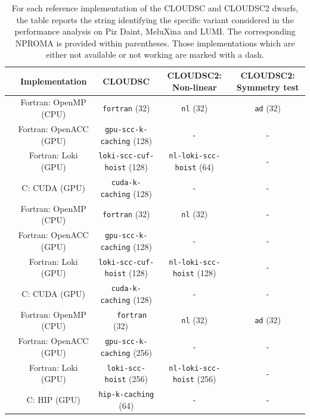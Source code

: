 \documentclass[gmd,manuscript,online]{copernicus}
\theoremstyle{theorem}
\theoremstyle{definition}
\theoremstyle{remark}
\theoremstyle{proposition}
\begin{document}
	\begin{table}[t!]
		\renewcommand{\arraystretch}{1.4}
		\centering
		\begin{footnotesize}
			\begin{tabular}{|c|c|c|c|c|}
				\hline
				& \textbf{Implementation} & \textbf{CLOUDSC} & \textbf{CLOUDSC2: Non-linear} & \textbf{CLOUDSC2: Symmetry test} \\
				\hline
				\multirow{4}{*}{\rotatebox[origin=c]{90}{\textbf{Piz Daint}}} & Fortran: OpenMP (CPU) & \texttt{fortran} (32) & \texttt{nl} (32) & \texttt{ad} (32) \\
				& Fortran: OpenACC (GPU) & \texttt{gpu-scc-k-caching} (128) & - & - \\
				& Fortran: Loki (GPU) & \texttt{loki-scc-cuf-hoist} (128) & \texttt{nl-loki-scc-hoist} (64) & - \\
				& C: CUDA (GPU) & \texttt{cuda-k-caching} (128) & - & - \\
				\hline
				\multirow{4}{*}{\rotatebox[origin=c]{90}{\textbf{MeluXina}}} & Fortran: OpenMP (CPU) & \texttt{fortran} (32) & \texttt{nl} (32) & - \\
				& Fortran: OpenACC (GPU) & \texttt{gpu-scc-k-caching} (128) & - & - \\
				& Fortran: Loki (GPU) & \texttt{loki-scc-cuf-hoist} (128) & \texttt{nl-loki-scc-hoist} (128) & - \\
				& C: CUDA (GPU) & \texttt{cuda-k-caching} (128) & - & - \\
				\hline
				\multirow{4}{*}{\rotatebox[origin=c]{90}{\textbf{LUMI}}} & Fortran: OpenMP (CPU) & ~~ \texttt{fortran} (32) ~~ & \texttt{nl} (32) & \texttt{ad} (32) \\
				& Fortran: OpenACC (GPU) & \texttt{gpu-scc-k-caching} (256) & - & - \\
				& Fortran: Loki (GPU) & \texttt{loki-scc-hoist} (256) & \texttt{nl-loki-scc-hoist} (256) & - \\
				& C: HIP (GPU) & \texttt{hip-k-caching} (64) & - & - \\
				\hline
			\end{tabular}
		\end{footnotesize}
		\vspace*{0.2cm}
		\caption{For each reference implementation of the CLOUDSC and CLOUDSC2 dwarfs, the table reports the string identifying the specific variant considered in the performance analysis on Piz Daint, MeluXina and LUMI. The corresponding NPROMA is provided within parentheses. Those implementations which are either not available or not working are marked with a dash.}
		\label{tab:versions}
	\end{table}
\end{document}

